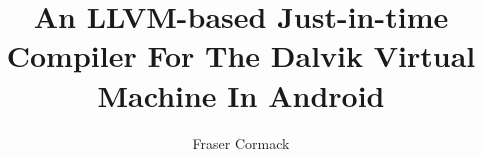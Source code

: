\documentclass[twoside,abbrevs,bsc,logo,notimes]{./styles/infthesis}
\title{An LLVM-based Just-in-time Compiler For The Dalvik Virtual Machine In Android}
\author{Fraser Cormack}
\begin{document}
    \begin{preliminary}
        \maketitle

        
        \standarddeclaration
        
        \tableofcontents
	\end{preliminary}

	
		
	
	
	
	
	
	\appendix
	

	
	
\end{document}
